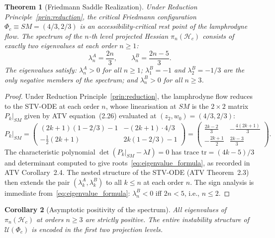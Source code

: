 \documentclass[12pt,a4paper]{article}
\theoremstyle{plain}
\newtheorem{theorem}{Theorem}[section]
\newtheorem{corollary}[theorem]{Corollary}
\theoremstyle{definition}
\theoremstyle{remark}
\newcommand{\Phic}{\Phi_c}
\newcommand{\Uacc}{\mathcal{U}}
\newcommand{\piproj}{\pi}
\newcommand{\Hacc}{\mathcal{H}}
\newcommand{\SM}{\mathit{SM}}
\newcommand{\lAn}[1]{\lambda^A_{#1}}
\newcommand{\lBn}[1]{\lambda^B_{#1}}
\begin{document}
\begin{theorem}[Friedmann Saddle Realization]
\label{thm:B}
Under Reduction Principle~\ref{prin:reduction}, the critical Friedmann configuration
$\Phic \equiv \SM = (4/3, 2/3)$ is an accessibility-critical rest point of the
lamphrodyne flow. The spectrum of the $n$-th level projected Hessian
$\piproj_n(\Hacc_c)$ consists of exactly two eigenvalues at each order $n\geq 1$:
\begin{equation}
  \lAn{n} = \frac{2n}{3},
  \qquad
  \lBn{n} = \frac{2n-5}{3}.
  \label{eq:eigenvalue_formula}
\end{equation}
The eigenvalues satisfy: $\lAn{n} > 0$ for all $n\geq 1$; $\lBn{1} = -1$ and
$\lBn{2} = -1/3$ are the only negative members of the spectrum; and $\lBn{n} > 0$
for all $n\geq 3$.
\end{theorem}

\begin{proof}
Under Reduction Principle~\ref{prin:reduction}, the lamphrodyne flow reduces to
the STV-ODE at each order $n$, whose linearisation at $\SM$ is the $2\times 2$
matrix $P_k|_{\SM}$ given by ATV equation~(2.26) evaluated at $(z_2,w_0) = (4/3,2/3)$:
\begin{equation}
  P_k\big|_{\SM}
  = \begin{pmatrix}
    (2k+1)(1-2/3) - 1 & -(2k+1)\cdot 4/3 \\
    -\tfrac{1}{2}(2k+1) & 2k(1-2/3) - 1
  \end{pmatrix}
  = \begin{pmatrix}
    \tfrac{2k-2}{3} & -\tfrac{4(2k+1)}{3} \\
    -\tfrac{2k+1}{2} & \tfrac{2k-3}{3}
  \end{pmatrix}.
  \label{eq:Pk_matrix}
\end{equation}
The characteristic polynomial $\det(P_k|_{\SM} - \lambda I) = 0$ has trace
$\mathrm{tr} = (4k-5)/3$ and determinant computed to give roots~\eqref{eq:eigenvalue_formula},
as recorded in ATV Corollary~2.4. The nested structure of the STV-ODE (ATV
Theorem~2.3) then extends the pair $(\lAn{k},\lBn{k})$ to all $k\leq n$ at each
order $n$. The sign analysis is immediate from~\eqref{eq:eigenvalue_formula}:
$\lBn{n} < 0$ iff $2n < 5$, i.e., $n\leq 2$.
\end{proof}

\begin{corollary}[Asymptotic positivity of the spectrum]
\label{cor:asymptotic_pos}
All eigenvalues of $\piproj_n(\Hacc_c)$ at orders $n\geq 3$ are strictly positive.
The entire instability structure of $\Uacc(\Phic)$ is encoded in the first two
projection levels.
\end{corollary}
\end{document}

